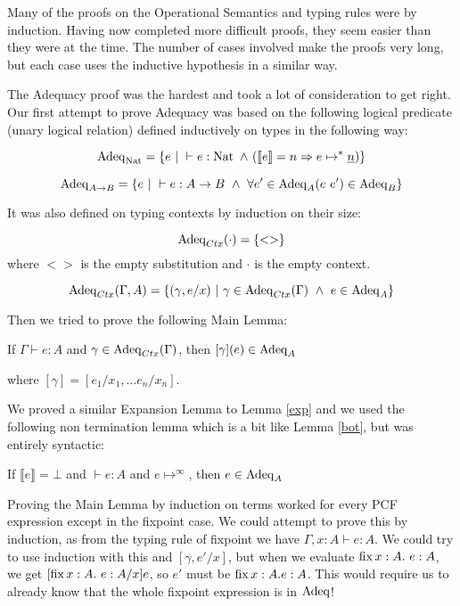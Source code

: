 Many of the proofs on the Operational Semantics and typing rules were by induction. Having now completed more difficult proofs, they seem easier than they were at the time. The number of cases involved make the proofs very long, but each case uses the inductive hypothesis in a similar way.  

The Adequacy proof was the hardest and took a lot of consideration to get right. Our first attempt to prove Adequacy was based on the following logical predicate (unary logical relation) defined inductively on types in the following way:

\[\operatorname{Adeq}_{\operatorname{Nat}} = \{e  \ | \ \vdash e : \operatorname{Nat} \ \wedge \ (\llbracket e \rrbracket = n \Rightarrow e \mapsto^* \underline{n}) \} \]

\[\operatorname{Adeq}_{A \to B} = \{ e \ | \  \vdash e : A \to B \ \wedge \ \forall e' \in \operatorname{Adeq}_A (e \ e') \in \operatorname{Adeq}_B \}\]

It was also defined on typing contexts by induction on their size:

\[\operatorname{Adeq}_{Ctx} (\cdot) = \{ <>\} \]
where $<>$ is the empty substitution and $\cdot$ is the empty context.

\[\operatorname{Adeq}_{Ctx}(\Gamma, A) = \{ (\gamma, e/x) \ | \ \gamma \in \operatorname{Adeq}_{Ctx}(\Gamma) \ \wedge \ e \in \operatorname{Adeq}_A\} \]

Then we tried to prove the following Main Lemma:

\vspace{0.5cm}

\begin{lem}
If $\Gamma \vdash e:A$ and $\gamma \in \operatorname{Adeq}_{Ctx}(\Gamma)$, then $[\gamma](e) \in \operatorname{Adeq}_A$
\end{lem}

where $[\gamma] = [e_1/x_1, \dots e_n/x_n]$.

We proved a similar Expansion Lemma to Lemma \ref{exp} and we used the following non termination lemma which is a bit like Lemma \ref{bot}, but was entirely syntactic:

\vspace{0.5cm}

\begin{lem}
If $\llbracket e \rrbracket = \bot$ and $\vdash e : A$ and $e \mapsto^{\infty}$, then $e \in \operatorname{Adeq}_A$
\end{lem}

Proving the Main Lemma by induction on terms worked for every PCF expression except in the fixpoint case. We could attempt to prove this by induction, as from the typing rule of fixpoint we have $\Gamma, x : A \vdash e : A$. We could try to use induction with this and  $[\gamma, e'/x]$, but when we evaluate $\operatorname{fix} x: A . \ e : A$, we get $[\operatorname{fix} x:A. \ e: A/ x]e$, so  $e'$ must be $\operatorname{fix} x:A. e : A$. This would require us to already know that the whole fixpoint expression is in $\operatorname{Adeq}$!

